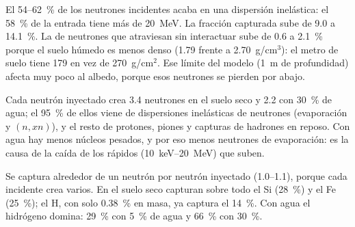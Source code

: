 \documentclass[11pt,a4paper]{article}
\newcommand{\tabla}[1]{}
\begin{document}
\begin{table}[H]
	\centering
	\caption{Destino del neutrón incidente, según su última interacción: capturado; destruido por una dispersión
		inelástica; solo dispersiones elásticas (sale del suelo hacia arriba, por los lados o por el fondo); o ninguna
		interacción. Estos últimos son neutrones de más de $\sim$60~MeV que atraviesan el metro de suelo y salen por el
		fondo.}\label{tab:dest}
	\small
\tabla{destino}
\end{table}

El 54--62~\% de los neutrones incidentes acaba en una dispersión inelástica: el 58~\% de la entrada tiene más de
20~MeV. La fracción capturada sube de 9.0 a 14.1~\%. La de neutrones que atraviesan sin interactuar sube de 0.6 a
2.1~\% porque el suelo húmedo es menos denso (1.79 frente a 2.70~g/cm$^3$): el metro de suelo tiene 179 en vez de
270~g/cm$^2$. Ese límite del modelo (1~m de profundidad) afecta muy poco al albedo, porque esos neutrones se
pierden por abajo.

\begin{table}[H]
	\centering
	\caption{Neutrones creados en el suelo por neutrón inyectado, según el proceso que los creó: dispersión inelástica
		de neutrones (\texttt{neutronInelastic}) y de protones (\texttt{protonInelastic}), captura de hadrones en reposo
		(\texttt{hBertiniCaptureAtRest}) y dispersión inelástica de piones.}\label{tab:crea}
	\footnotesize\setlength\tabcolsep{4pt}
\tabla{creados}

\end{table}

Cada neutrón inyectado crea 3.4 neutrones en el suelo seco y 2.2 con 30~\% de agua; el 95~\% de ellos viene de
dispersiones inelásticas de neutrones (evaporación y $(n,xn)$), y el resto de protones, piones y capturas de
hadrones en reposo. Con agua hay menos núcleos pesados, y por eso menos neutrones de evaporación: es la causa de la
caída de los rápidos (10~keV--20~MeV) que suben.

\begin{table}[H]
	\centering
	\caption{Capturas de neutrones en el suelo: número por neutrón inyectado y reparto por núcleo [\%].}\label{tab:cap}
	\footnotesize\setlength\tabcolsep{4pt}
\tabla{capturas}
\end{table}

Se captura alrededor de un neutrón por neutrón inyectado (1.0--1.1), porque cada incidente crea varios. En el suelo
seco capturan sobre todo el Si (28~\%) y el Fe (25~\%); el H, con solo 0.38~\% en masa, ya captura el 14~\%. Con
agua el hidrógeno domina: 29~\% con 5~\% de agua y 66~\% con 30~\%.
\end{document}
